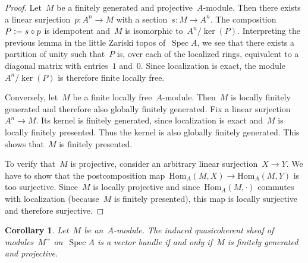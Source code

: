 \documentclass[12pt]{scrartcl}
\theoremstyle{definition}
\theoremstyle{plain}
\newtheorem*{cor}{Corollary}
\theoremstyle{remark}
\newcommand{\defeq}{\vcentcolon=}
\newcommand{\Hom}{\mathrm{Hom}}
\begin{document}
\begin{proof}Let~$M$ be a finitely generated and projective~$A$-module. Then
there exists a linear surjection~$p : A^n \to M$ with a section~$s : M \to
A^n$. The composition~$P \defeq s \circ p$ is idempotent and~$M$ is isomorphic
to~$A^n/\operatorname{ker}(P)$. Interpreting the previous lemma in the little
Zariski topos of~$\operatorname{Spec} A$, we see that there exists a partition
of unity such that~$P$ is, over each of the localized rings, equivalent to a
diagonal matrix with entries~$1$ and~$0$. Since localization is exact, the
module~$A^n/\operatorname{ker}(P)$ is therefore finite locally free.

Conversely, let~$M$ be a finite locally free~$A$-module. Then~$M$ is locally
finitely generated and therefore also globally finitely generated. Fix a linear
surjection~$A^n \to M$. Its kernel is finitely generated, since localization is
exact and~$M$ is locally finitely presented. Thus the kernel is also globally
finitely generated. This shows that~$M$ is finitely presented.

To verify that~$M$ is projective, consider an arbitrary linear surjection~$X
\to Y$. We have to show that the postcomposition map~$\Hom_A(M,X) \to
\Hom_A(M,Y)$ is too surjective. Since~$M$ is locally projective and
since~$\Hom_A(M,\cdot)$ commutes with localization (because~$M$ is finitely
presented), this map is locally surjective and therefore surjective.
\end{proof}

\begin{cor}Let~$M$ be an~$A$-module. The induced quasicoherent sheaf of
modules~$M^\sim$ on~$\operatorname{Spec} A$ is a vector bundle if and only
if~$M$ is finitely generated and projective.\end{cor}
\end{document}
